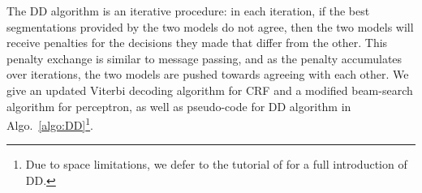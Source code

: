 The DD algorithm is an iterative procedure: in each iteration, if the best segmentations provided by the two models do not agree, then the two models will receive penalties for the decisions they made that differ from the other. This penalty exchange is similar to message passing, and as the penalty accumulates over iterations, the two models are pushed towards agreeing with each other. We give an updated Viterbi decoding algorithm for CRF and a modified beam-search algorithm for perceptron, as well as pseudo-code for DD algorithm in Algo.~\ref{algo:DD}\footnote{Due to space limitations, we defer to the tutorial of  for a full introduction of DD.}.



